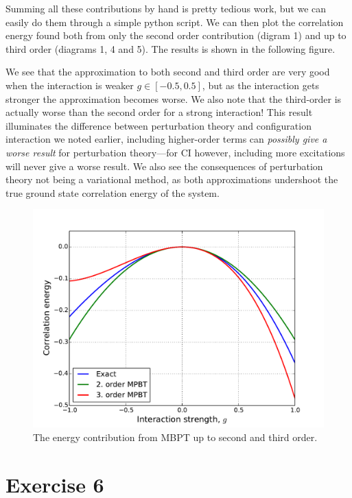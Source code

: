 \documentclass[a4paper, 11pt, notitlepage, english]{article}
\begin{document}
Summing all these contributions by hand is pretty tedious work, but we can easily do them through a simple python script. We can then plot the correlation energy found both from only the second order contribution (digram 1) and up to third order (diagrams 1, 4 and 5). The results is shown in the following figure.

We see that the approximation to both second and third order are very good when the interaction is weaker $g\in[-0.5,0.5]$, but as the interaction gets stronger the approximation becomes worse. We also note that the third-order is actually worse than the second order for a strong interaction! This result illuminates the difference between perturbation theory and configuration interaction we noted earlier, including higher-order terms can \emph{possibly give a worse result} for perturbation theory---for CI however, including more excitations will never give a worse result. We also see the consequences of perturbation theory not being a variational method, as both approximations undershoot the true ground state correlation energy of the system.



\begin{figure}[htbp]
\centering
\includegraphics[width=\textwidth]{pert_1.pdf}
\caption{The energy contribution from MBPT up to second and third order.}
\end{figure}


\clearpage

\section*{Exercise 6}
\end{document}
